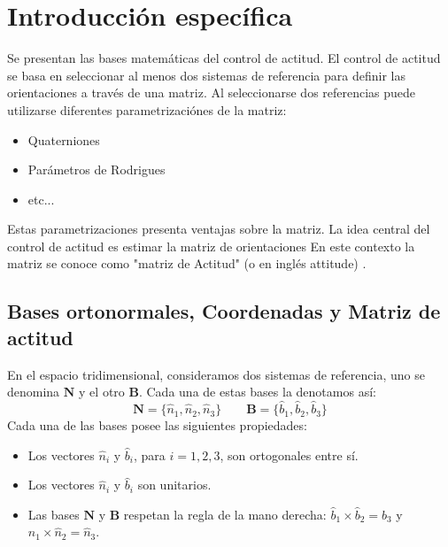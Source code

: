 \chapter{Introducción específica} %

\label{Chapter2}

Se presentan las bases matemáticas del control de actitud. El control de actitud se basa en seleccionar al menos dos sistemas de referencia para definir las orientaciones a través de una matriz. Al seleccionarse dos referencias puede utilizarse diferentes parametrizaciónes de la matriz: 
\begin{itemize}
	\item Quaterniones
	\item Parámetros de Rodrigues
	\item etc... 
\end{itemize}
Estas parametrizaciones presenta ventajas sobre la matriz. La idea central del control de actitud es estimar la matriz de orientaciones En este contexto la matriz se conoce como "matriz de Actitud" (o en inglés attitude) \citep{ARTICLE:1}. 
 
 
 
 

\section{Bases ortonormales, Coordenadas y Matriz de actitud}
\label{sec:matriz_actitud}
En el espacio tridimensional, consideramos dos sistemas de referencia, uno se denomina $\mathbf{N}$ y el otro $\mathbf{B}$. Cada una de estas bases  la denotamos así: 
\begin{equation}
	\mathbf{N} = \{ \hat{n}_1, \hat{n}_2, \hat{n}_3 \}
	\qquad
	\mathbf{B} = \{ \hat{b}_1, \hat{b}_2, \hat{b}_3 \}
\end{equation}
Cada una de las bases posee las siguientes propiedades: 

\begin{itemize}
\item Los vectores $\hat{n}_i$ y $\hat{b}_i$, para $i = 1, 2, 3$, son ortogonales entre sí.
\item Los vectores $\hat{n}_i$ y $\hat{b}_i$ son unitarios.
\item Las bases $\mathbf{N}$ y $\mathbf{B}$ respetan la regla de la mano derecha: 
$\hat{b}_1 \times \hat{b}_2 = \hat{b}_3$ y $\hat{n}_1 \times \hat{n}_2 = \hat{n}_3$.
\end{itemize}


